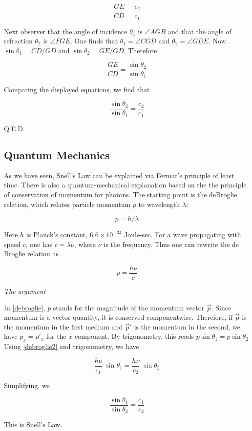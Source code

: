 \begin{equation}
\frac{GE}{CD} = \frac{c_2}{c_1}
\end{equation}

Next observer that the angle of incidence $\theta_1$ is $\angle AGB$ and that the angle of refraction $\theta_2$ is $\angle FGE$. One finds that $\theta_1 = \angle CGD$ and $\theta_2 = \angle GDE$.  Now $\sin \theta_1 = CD/GD$ and $\sin\theta_2 = GE/GD$.  Therefore

\begin{equation}
\frac{GE}{CD} = \frac{\sin\theta_2}{\sin\theta_1}
\end{equation}

Comparing the displayed equations, we find that

\begin{equation}
\frac{\sin\theta_2}{\sin\theta_1} = \frac{c_2}{c_1}
\end{equation}

Q.E.D.


\subsection{Quantum Mechanics}

As we have seen, Snell's Law can be explained via Fermat's principle of least time.  There is also a quantum-mechanical explanation based on the the principle of conservation of momentum for photons.
The starting point is the deBroglie relation, which relates particle momentum $p$ to wavelength $\lambda$: 

\begin{equation}
\label{debroglie}
p = h/\lambda
\end{equation}

Here $h$ is Planck's constant, $6.6\times 10^{-34}$ Joule-sec.  For a wave propagating with speed $c$, one has $c = \lambda\nu$, where $\nu$ is the frequency.  Thus one can rewrite the de Broglie relation as 

\begin{equation}
\label{debroglie2}
  p = \frac{h\nu}{c}
\end{equation}


\emph{The argument}

In \eqref{debroglie}, $p$ stands for the magnitude of the momentum vector
$\vec p$. Since momentum is a vector quantity, it is
conserved componentwise.  Therefore, if $\vec p$ is the 
momentum in the first medium and $\vec p'$  is 
the momentum in the second, we have $p_x = p'_x$ for the
$x$ component. By trigonometry, this reads $p\sin\theta_1 = p\sin\theta_2$  Using \eqref{debroglie2} and trigonometry, we 
have

\begin{equation}
\frac{h\nu}{c_1}\;\sin \theta_1
=
\frac{h \nu}{c_2}\;\sin \theta_2
\end{equation}

Simplifying, we 

\begin{equation}
\frac{\sin \theta_1}{\sin \theta_2}
=
\frac{c_1}{c_2}
\end{equation}

This is Snell's Law.

